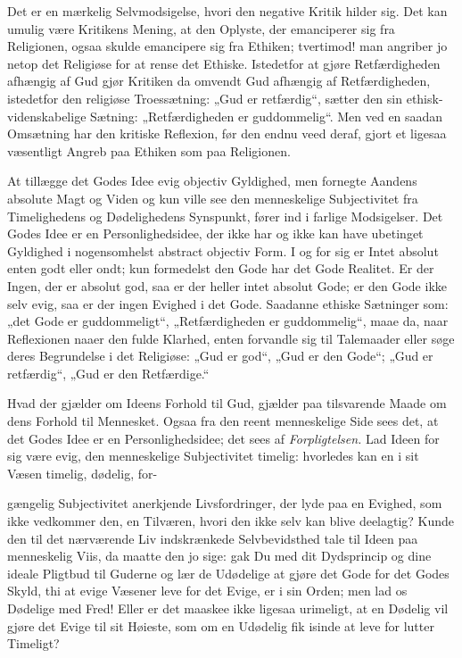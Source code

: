 \documentclass[12pt,a4paper]{book}
\begin{document}
Det er en mærkelig Selvmodsigelse, hvori den negative Kritik hilder sig. Det kan
umulig være Kritikens Mening, at den Oplyste, der emanciperer sig fra Religionen,
ogsaa skulde emancipere sig fra Ethiken; tvertimod! man angriber jo netop det
Religiøse for at rense det Ethiske. Istedetfor at gjøre Retfærdigheden afhængig
af Gud gjør Kritiken da omvendt Gud afhængig af Retfærdigheden, istedetfor den
religiøse Troessætning: „Gud er retfærdig“, sætter den sin ethisk-videnskabelige
Sætning: „Retfærdigheden er guddommelig“. Men ved en saadan Omsætning har den
kritiske Reflexion, før den endnu veed deraf, gjort et ligesaa væsentligt Angreb
paa Ethiken som paa Religionen.

At tillægge det Godes Idee evig objectiv Gyldighed, men fornegte Aandens absolute
Magt og Viden og kun ville see den menneskelige Subjectivitet fra Timelighedens
og Dødelighedens Synspunkt, fører ind i farlige Modsigelser. Det Godes Idee er en
Personlighedsidee, der ikke har og ikke kan have ubetinget Gyldighed i
nogensomhelst abstract objectiv Form. I og for sig er Intet absolut enten godt
eller ondt; kun formedelst den Gode har det Gode Realitet. Er der Ingen, der er
absolut god, saa er der heller intet absolut Gode; er den Gode ikke selv evig,
saa er der ingen Evighed i det Gode. Saadanne ethiske Sætninger som: „det Gode er
guddommeligt“, „Retfærdigheden er guddommelig“, maae da, naar Reflexionen naaer
den fulde Klarhed, enten forvandle sig til Talemaader eller søge deres
Begrundelse i det Religiøse: „Gud er god“, „Gud er den Gode“; „Gud er
retfærdig“, „Gud er den Retfærdige.“

Hvad der gjælder om Ideens Forhold til Gud, gjælder paa tilsvarende Maade om dens
Forhold til Mennesket. Ogsaa fra den reent menneskelige Side sees det, at det
Godes Idee er en Personlighedsidee; det sees af \emph{Forpligtelsen.} Lad Ideen
for sig være evig, den menneskelige Subjectivitet timelig: hvorledes kan en i sit
Væsen timelig, dødelig, for-

gængelig Subjectivitet anerkjende Livsfordringer, der lyde paa en Evighed, som
ikke vedkommer den, en Tilværen, hvori den ikke selv kan blive deelagtig? Kunde
den til det nærværende Liv indskrænkede Selvbevidsthed tale til Ideen paa
menneskelig Viis, da maatte den jo sige: gak Du med dit Dydsprincip og dine
ideale Pligtbud til Guderne og lær de Udødelige at gjøre det Gode for det Godes
Skyld, thi at evige Væsener leve for det Evige, er i sin Orden; men lad os
Dødelige med Fred! Eller er det maaskee ikke ligesaa urimeligt, at en Dødelig vil
gjøre det Evige til sit Høieste, som om en Udødelig fik isinde at leve for lutter
Timeligt?
\end{document}
